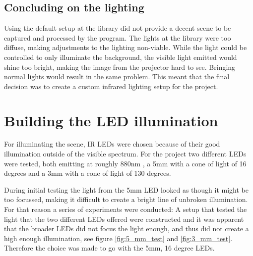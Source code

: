 \subsection{Concluding on the lighting}
Using the default setup at the library did not provide a decent scene to be captured and processed by the program. The lights at the library were too diffuse, making adjustments to the lighting non-viable. While the light could be controlled to only illuminate the background, the visible light emitted would shine too bright, making the image from the projector hard to see. Bringing normal lights would result in the same problem. This meant that the final decision was to create a custom infrared lighting setup for the project.

\section{Building the LED illumination}
For illuminating the scene, IR LEDs were chosen because of their good illumination outside of the visible spectrum. For the project two different LEDs were tested, both emitting at roughly 880nm \citep{5mm_led} \citep{3mm_led}, a 5mm with a cone of light of 16 degrees and a 3mm with a cone of light of 130 degrees.

During initial testing the light from the 5mm LED looked as though it might be too focussed, making it difficult to create a bright line of unbroken illumination. For that reason a series of experiments were conducted: A setup that tested the light that the two different LEDs offered were constructed and it was apparent that the broader LEDs did not focus the light enough, and thus did not create a high enough illumination, see figure \ref{fig:5_mm_test} and \ref{fig:3_mm_test}. Therefore the choice was made to go with the 5mm, 16 degree LEDs.

